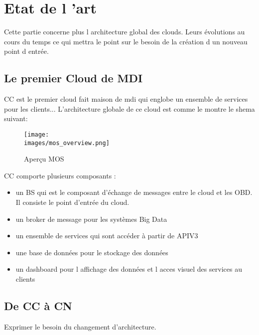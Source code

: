 \section{Etat de l 'art}
   Cette partie concerne plus l architecture global des clouds. Leurs évolutions 
   au cours du temps ce qui mettra le point sur le besoin de la création d un nouveau 
   point d entrée.   

    \subsection{Le premier Cloud de MDI}
        \gls{CC} est le premier cloud fait maison de \gls{mdi} qui englobe un ensemble 
        de services pour les clients... L'architecture globale de ce cloud est comme le montre 
        le shema suivant: 

        \begin{figure}[ht]
            \centering
            \texttt{[image: \\images/mos\_overview.png]}
            \caption{Aper\c cu MOS}
        \end{figure}

        \gls{CC} comporte plusieurs composants : 
        \begin{itemize}
            \renewcommand{\labelitemi}{$\bullet$}
            \item  un \gls{BS} qui est le composant d'échange de messages entre le cloud et 
            les OBD. Il consiste le point d'entrée du cloud.
            \item  un broker de message pour les systèmes Big Data
            \item  un ensemble de services qui sont accéder à partir de APIV3 
            \item une base de données pour le stockage des données 
            \item un dashboard pour l affichage des données et l acces visuel 
            des services au clients 
        \end{itemize}
       
    \break

    \subsection{De \gls{CC} à \gls{CN}}
        Exprimer le besoin du changement d'architecture. 


       

        \vspace{0.2cm}

